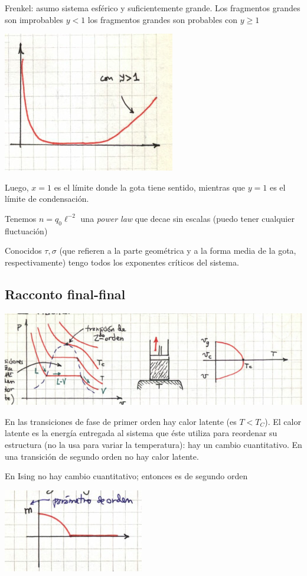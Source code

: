 \documentclass[10pt,oneside]{CBFT_book}
\begin{document}
Frenkel: asumo sistema esférico y suficientemente grande. Los fragmentos grandes son improbables $y<1$
los fragmentos grandes son probables con $y \geq 1$

\includegraphics[scale=0.5]{images/1606337193.jpg}

Luego, $x=1$ es el límite donde la gota tiene sentido, mientras que $y=1$ es el límite de condensación.

Tenemos $n = q_0 \ell^{-2}$ una {\it power law} que decae sin escalas (puedo tener cualquier fluctuación)

Conocidos $\tau,\sigma$ (que refieren a la parte geométrica y a la forma media de la gota, respectivamente)
tengo todos los exponentes críticos del sistema.

\subsection{Racconto final-final}

\includegraphics[scale=0.5]{images/1606337201.jpg}

En las transiciones de fase de primer orden hay calor latente (es $T<T_C$). 
El calor latente es la energía entregada al sistema que éste utiliza para reordenar su estructura (no la
usa para variar la temperatura): hay un cambio cuantitativo.
En una transición de segundo orden no hay calor latente.

En Ising no hay cambio cuantitativo; entonces es de segundo orden

\includegraphics[scale=0.5]{images/1606337206.jpg}
\end{document}
